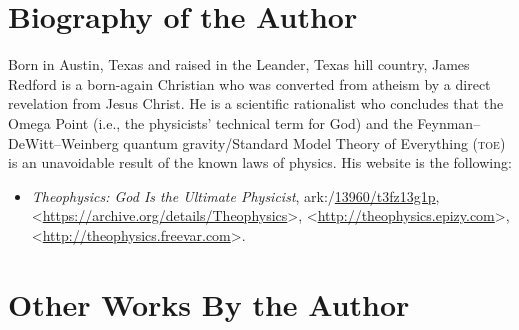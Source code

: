 \documentclass[letterpaper,12pt]{article}
\newcommand{\dsc}{\discretionary{}{}{}}
\begin{document}
\section{Biography of the Author}
\label{sec:BiographyOfTheAuthor}

Born in Austin, Texas and raised in the Leander, Texas hill country, James Redford is a born-again Christian who was converted from atheism by a direct revelation from Jesus Christ. He is a scientific rationalist who concludes that the Omega Point (i.e., the physicists' technical term for God) and the Feynman--DeWitt--Weinberg quantum gravity\slash Standard Model Theory of Everything (\textsc{toe}) is an unavoidable result of the known laws of physics. His website is the following:

\begin{itemize}
\small
\item \emph{Theophysics: God Is the Ultimate Physicist}, ark:/\discretionary{}{}{}\href{https://archive.org/details/Theophysics}{13960/\dsc t3fz13g1p}, \textless\url{https://archive.org/details/Theophysics}\textgreater , \textless\url{http://theophysics.epizy.com}\textgreater , \textless\href{http://theophysics.freevar.com}{\textsf{http\dsc :\dsc //\dsc theophysics\dsc .freevar\dsc .com}}\textgreater .
\end{itemize}

\section{Other Works By the Author}
\label{sec:OtherWorksByTheAuthor}
\end{document}
